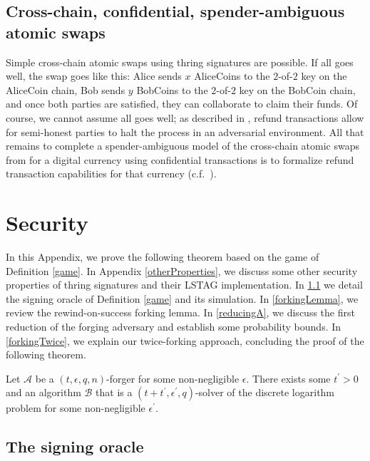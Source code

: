 \documentclass{iacrtrans}
\theoremstyle{definition}
\numberwithin{theorem}{subsection}
\numberwithin{lemma}{theorem}
\newcommand{\adversary}{\mathcal{A}}
\begin{document}
\subsection{Cross-chain, confidential, spender-ambiguous atomic swaps}

Simple cross-chain atomic swaps using thring signatures are possible. If all goes well, the swap goes like this: Alice sends $x$ AliceCoins to the $2$-of-$2$ key on the AliceCoin chain, Bob sends $y$ BobCoins to the $2$-of-$2$ key on the BobCoin chain, and once both parties are satisfied, they can collaborate to claim their funds. Of course, we cannot assume all goes well; as described in \cite{back2014enabling}, refund transactions allow for semi-honest parties to halt the process in an adversarial environment. All that remains to complete a spender-ambiguous model of the cross-chain atomic swaps from \cite{back2014enabling} for a digital currency using confidential transactions is to formalize refund transaction capabilities for that currency (c.f.\ \cite{noether2018dlsag}).






\appendix 

\section{Security}\label{security}

In this Appendix, we prove the following theorem based on the game of Definition \ref{game}. In Appendix \ref{otherProperties}, we discuss some other security properties of thring signatures and their LSTAG implementation. In \ref{sigoracle} we detail the signing oracle of Definition \ref{game} and its simulation. In \ref{forkingLemma}, we review the rewind-on-success forking lemma. In \ref{reducingA}, we discuss the first reduction of the forging adversary and establish some probability bounds. In \ref{forkingTwice}, we explain our twice-forking approach, concluding the proof of the following theorem.


\begin{theorem}
Let $\adversary$ be a $(t,\epsilon,q,n)$-forger for some non-negligible $\epsilon$. There exists some $t^\prime > 0$ and an algorithm $\mathcal{B}$ that is a $(t+t^\prime, \epsilon^\prime, q)$-solver of the discrete logarithm problem for some non-negligible $\epsilon^\prime$.
\end{theorem}

\subsection{The signing oracle}\label{sigoracle}
\end{document}

